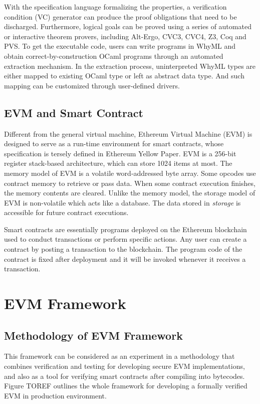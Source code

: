 \documentclass[runningheads]{llncs}
\begin{document}
With the specification language formalizing the properties, a verification condition (VC) generator can produce the proof obligations that need to be discharged. Furthermore, logical goals can be proved using a series of automated or interactive theorem provers, including Alt-Ergo, CVC3, CVC4, Z3, Coq and PVS. To get the executable code, users can write programs in WhyML and obtain correct-by-construction OCaml programs through an automated extraction mechanism. In the extraction process, uninterpreted WhyML types are either mapped to existing OCaml type or left as abstract data type. And such mapping can be customized through user-defined drivers. 
\subsection{EVM and Smart Contract}
Different from the general virtual machine, Ethereum Virtual Machine (EVM) is designed to serve as a run-time environment for smart contracts, whose specification is tersely defined in Ethereum Yellow Paper\cite{wood2014ethereum}.
EVM is a 256-bit register stack-based architecture, which can store 1024 items at most. The memory model of EVM is a volatile word-addressed byte array. Some opcodes use contract memory to retrieve or pass data. When some contract execution finishes, the memory contents are cleared. Unlike the memory model, the storage model of EVM is non-volatile which acts like a database. The data stored in \textit{storage} is accessible for future contract executions.

Smart contracts are essentially programs deployed on the Ethereum blockchain used to conduct transactions or perform specific actions. Any user can create a contract by posting a transaction to the blockchain. The program code of the contract is fixed after deployment and it will be invoked whenever it receives a transaction. 
\section{EVM Framework}\label{Sec: Framework}
\subsection{Methodology of EVM Framework}
This framework can be considered as an experiment in a methodology that combines verification and testing for developing secure EVM implementations, and also as a tool for verifying smart contracts after compiling into bytecodes. Figure TOREF outlines the whole framework for developing a formally verified EVM in production environment.
\end{document}

